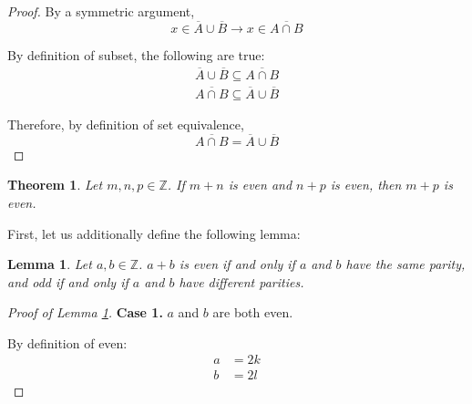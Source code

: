 \documentclass{article}
\newtheorem{theorem}{Theorem}
\newtheorem{lemma}{Lemma}
\numberwithin{subcase}{case}
\begin{document}
\begin{outline}[enumerate]
\begin{proof}
            By a symmetric argument, 
            \begin{equation}
                x \in \overline{A} \cup \overline{B} \rightarrow x \in \overline{A \cap B}  
            \end{equation}
            
            By definition of subset, the following are true:
            \begin{equation}
                \begin{aligned}
                    \overline{A} \cup \overline{B} \subseteq \overline{A \cap B}   \\
                    \overline{A \cap B} \subseteq \overline{A} \cup \overline{B}  
                \end{aligned}
            \end{equation}

            Therefore, by definition of set equivalence,
            \begin{equation}
                \overline{A \cap B} = \overline{A} \cup \overline{B}
            \end{equation}
        \end{proof}

    \1 \begin{theorem}
            \label{thm:q6}
            Let $m, n, p \in \mathbb{Z}$. If $m + n$ is even and $n + p$ is even, then 
            $m + p$ is even.
        \end{theorem}
            
        First, let us additionally define the following lemma:

        \begin{lemma}
            \label{thm:evenlemma}
            Let $a, b \in \mathbb{Z}$. $a + b$ is even if and only if $a$ and $b$ have 
            the same parity, and odd if and only if $a$ and $b$ have different parities.
        \end{lemma}
            
        \begin{proof}[Proof of Lemma \ref{thm:evenlemma}]
            
            \textbf{Case 1.} $a$ and $b$ are both even.

            By definition of even:
            \begin{equation}
                \begin{aligned}
                    a &= 2k \\ 
                    b &= 2l
                \end{aligned}
            \end{equation}


\end{proof}
\end{outline}
\end{document}
